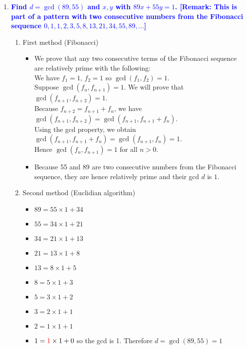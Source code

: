 \documentclass[11pt]{article}
\begin{document}
\begin{enumerate}
\item \textbf{\textcolor{blue}{Find $d=\gcd(89,55)$ and $x,y$ with $89x+55y=1$. [Remark: This is part of a pattern with two consecutive numbers from the Fibonacci sequence $0,1,1,2,3,5,8,13,21,34,55,89,\ldots$]}}
    \begin{enumerate}
        \item First method (Fibonacci)
        \begin{itemize}
            \item We prove that any two consecutive terms  of the Fibonacci sequence are relatively prime with the following:
            \\ We have $f_1 = 1$, $f_2 = 1$ so $\gcd(f_1, f_2) = 1$.
            \\ Suppose $\gcd(f_n, f_{n+1}) = 1$. We will prove that $\gcd(f_{n+1}, f_{n+2}) = 1$.
            \\ Because $f_{n+2} = f_{n+1} + f_n$, we have $\gcd(f_{n+1}, f_{n+2}) = \gcd(f_{n+1}, f_{n+1} + f_n)$.
            \\ Using the gcd property, we obtain $\gcd(f_{n+1}, f_{n+1} + f_n) = \gcd(f_{n+1}, f_n) = 1$.
            \\ Hence $\gcd(f_n, f_{n+1}) = 1$ for all $n > 0$.
            \item Because 55 and 89 are two consecutive numbers from the Fibonacci sequence, they are hence relatively prime and their gcd $d$ is $1$.
        \end{itemize}
        \item Second method (Euclidian algorithm)
        \begin{itemize}
            \item $89 = 55 \times 1 + 34$
            \item $55 = 34 \times 1 + 21$
            \item $34 = 21 \times 1 + 13$
            \item $21 = 13 \times 1 + 8$
            \item $13 = 8 \times 1 + 5$
            \item $8 = 5 \times 1 + 3$
            \item $5 = 3 \times 1 + 2$
            \item $3 = 2 \times 1 + 1$
            \item $2 = 1 \times 1 + 1$
            \item $1 = \textcolor{red}{1} \times 1 + 0$ so the gcd is 1. Therefore $d = \gcd(89, 55) = 1$
        \end{itemize}

\end{enumerate}
\end{enumerate}
\end{document}
